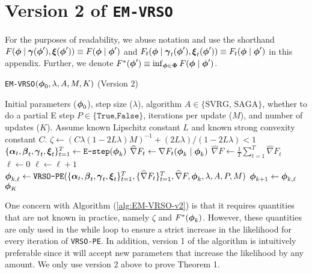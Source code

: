 \section{Version 2 of \texttt{EM-VRSO}}

For the purposes of readability, we abuse notation and use the shorthand $F(\boldsymbol{\phi} \mid \boldsymbol{\gamma}(\boldsymbol{\phi}'), \boldsymbol{\xi}(\boldsymbol{\phi}')) \equiv F(\boldsymbol{\phi} \mid \boldsymbol{\phi}')$ and $F_{t}(\boldsymbol{\phi} \mid \boldsymbol{\gamma}_{t}(\boldsymbol{\phi}'), \boldsymbol{\xi}_{t}(\boldsymbol{\phi}')) \equiv F_{t}(\boldsymbol{\phi} \mid \boldsymbol{\phi}')$ in this appendix. Further, we denote $F^*(\boldsymbol{\phi}') \equiv \inf_{\boldsymbol{\phi} \in \boldsymbol{\Phi}} F(\boldsymbol{\phi} \mid \boldsymbol{\phi}')$.

\begin{algorithm}
\caption{\texttt{EM-VRSO}$(\boldsymbol{\phi}_0, \lambda, A, M, K)$ (Version 2)}\label{alg:EM-VRSO-v2}
\begin{algorithmic}[1]
\Require Initial parameters ($\boldsymbol{\phi}_{0}$), step size ($\lambda$), algorithm $A \in \{\text{SVRG, SAGA}\}$, whether to do a partial E step $P \in \{\texttt{True,False}\}$, iterations per update ($M$), and number of updates ($K$). Assume known Lipschitz constant $L$ and known strong convexity constant $C$.
%
\vspace{5pt}
%
\State $\zeta \gets (C \lambda(1-2L\lambda)M)^{-1} + (2L\lambda) / (1-2L\lambda) < 1$ 
%
%
% 
\State $\{\boldsymbol{\alpha}_t,\boldsymbol{\beta}_t,\boldsymbol{\gamma}_t,\boldsymbol{\xi}_t\}_{t=1}^{T} \gets \texttt{E-step}(\boldsymbol{\phi}_{k})$ 
%
    \State $\widehat \nabla F_t \gets \nabla F_t(\boldsymbol{\phi}_k \mid \boldsymbol{\phi}_k)$
\EndFor
%
\State $\widehat \nabla F \gets \frac{1}{T} \sum_{t=1}^T \widehat \nabla F_t$
%
%
\State $\ell \gets 0$ 
%
\State $\ell \gets \ell+1$
\State $\boldsymbol{\phi}_{k,\ell} \gets \texttt{VRSO-PE}(\{\boldsymbol{\alpha}_t,\boldsymbol{\beta}_t,\boldsymbol{\gamma}_t,\boldsymbol{\xi}_t\}_{t=1}^{T}, \{\widehat \nabla F_t\}_{t=1}^T, \widehat \nabla F, \boldsymbol{\phi}_{k},\lambda,A,P,M)$
%
\EndWhile
\State $\boldsymbol{\phi}_{k+1} \gets \boldsymbol{\phi}_{k,\ell}$
\EndFor
\State \Return $\boldsymbol{\phi}_K$
\end{algorithmic}
\end{algorithm}

One concern with Algorithm (\ref{alg:EM-VRSO-v2}) is that it requires quantities that are not known in practice, namely $\zeta$ and $F^{*}(\boldsymbol{\phi}_{k})$. However, these quantities are only used in the while loop to ensure a strict increase in the likelihood for every iteration of \texttt{VRSO-PE}. In addition, version 1 of the algorithm is intuitively preferable since it will accept new parameters that increase the likelihood by any amount. We only use version 2 above to prove Theorem 1.

